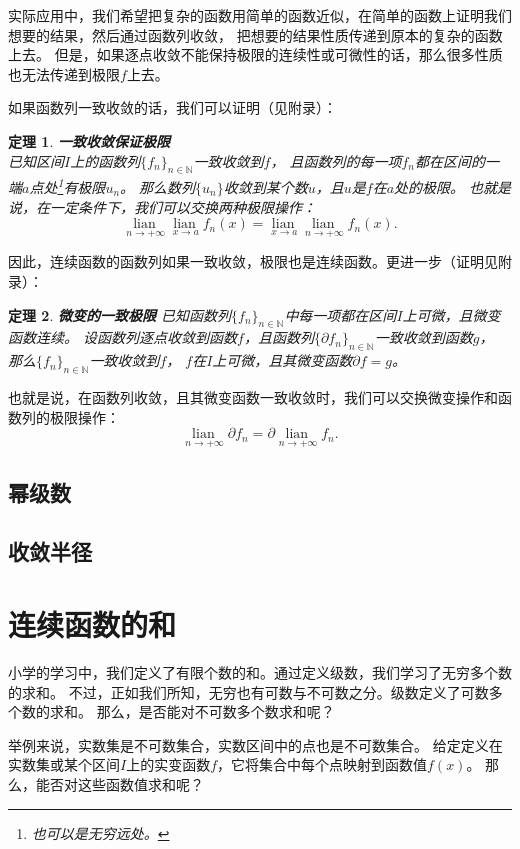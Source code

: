 \documentclass[12pt,UTF8]{ctexbook}
\newcommand{\lian}[1]{
    \underset{#1}{\operatorname{lian}\,}
}
\newtheorem{tm}{定理}[section]
\begin{document}
实际应用中，我们希望把复杂的函数用简单的函数近似，在简单的函数上证明我们想要的结果，然后通过函数列收敛，
把想要的结果性质传递到原本的复杂的函数上去。
但是，如果逐点收敛不能保持极限的连续性或可微性的话，那么很多性质也无法传递到极限$f$上去。

如果函数列一致收敛的话，我们可以证明（见附录）：
\begin{tm}\textbf{一致收敛保证极限}\\
    已知区间$I$上的函数列$\{f_n\}_{n\in\mathbb{N}}$一致收敛到$f$，
    且函数列的每一项$f_n$都在区间的一端$a$点处\footnote{也可以是无穷远处。}有极限$u_n$。
    那么数列$\{u_n\}$收敛到某个数$u$，且$u$是$f$在$a$处的极限。
    也就是说，在一定条件下，我们可以交换两种极限操作：
    $$ \lian{n\to +\infty} \lian{x\to a} f_n(x) = \lian{x\to a} \lian{n\to +\infty} f_n(x). $$
\end{tm}

因此，连续函数的函数列如果一致收敛，极限也是连续函数。更进一步（证明见附录）：

\begin{tm}{\textbf{微变的一致极限}}
    已知函数列$\{f_n\}_{n\in\mathbb{N}}$中每一项都在区间$I$上可微，且微变函数连续。
    设函数列逐点收敛到函数$f$，且函数列$\{\partial f_n\}_{n\in\mathbb{N}}$一致收敛到函数$g$，
    那么$\{f_n\}_{n\in\mathbb{N}}$一致收敛到$f$，
    $f$在$I$上可微，且其微变函数$\partial f = g$。
\end{tm}

也就是说，在函数列收敛，且其微变函数一致收敛时，我们可以交换微变操作和函数列的极限操作：
$$ \lian{n\to +\infty} \partial f_n = \partial \lian{n\to +\infty} f_n. $$

\section{幂级数}

\section{收敛半径}

\chapter{连续函数的和}

小学的学习中，我们定义了有限个数的和。通过定义级数，我们学习了无穷多个数的求和。
不过，正如我们所知，无穷也有可数与不可数之分。级数定义了可数多个数的求和。
那么，是否能对不可数多个数求和呢？

举例来说，实数集是不可数集合，实数区间中的点也是不可数集合。
给定定义在实数集或某个区间$I$上的实变函数$f$，它将集合中每个点映射到函数值$f(x)$。
那么，能否对这些函数值求和呢？
\end{document}
